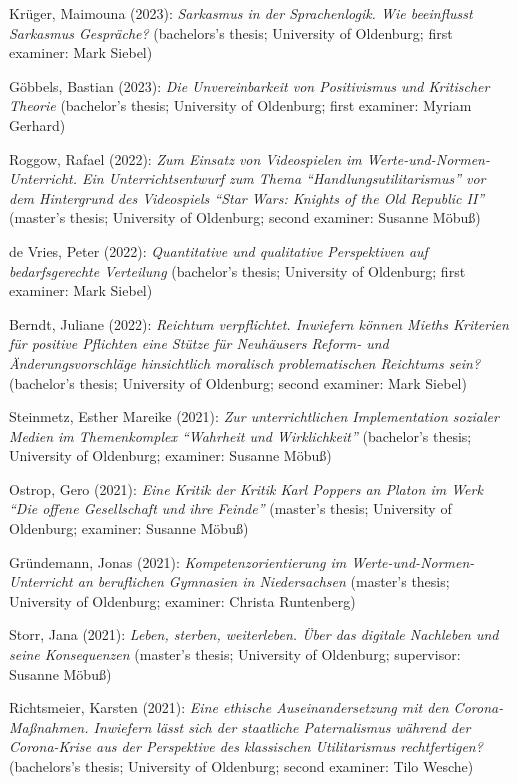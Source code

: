 \documentclass[a4paper,10pt]{article}
\newenvironment{literature}{%
   \parskip6pt\parindent0pt\raggedright
   \def\lititem{\hangindent=1cm\hangafter1}}{%
   \par\ignorespaces}
\begin{document}
\begin{literature}
\lititem Krüger, Maimouna (2023): \textit{Sarkasmus in der Sprachenlogik. Wie beeinflusst Sarkasmus Gespräche?} (bachelors's thesis; University of Oldenburg; first examiner: Mark Siebel)

\lititem Göbbels, Bastian (2023): \textit{Die Unvereinbarkeit von Positivismus und Kritischer Theorie} (bachelor's thesis; University of Oldenburg; first examiner: Myriam Gerhard)

\lititem Roggow, Rafael (2022): \textit{Zum Einsatz von Videospielen im Werte-und-Normen-Unterricht. Ein Unterrichtsentwurf zum Thema \enquote{Handlungsutilitarismus} vor dem Hintergrund des Videospiels \enquote{Star Wars: Knights of the Old Republic II}} (master's thesis; University of Oldenburg; second examiner: Susanne Möbuß)

\lititem de Vries, Peter (2022): \textit{Quantitative und qualitative Perspektiven auf bedarfsgerechte Verteilung} (bachelor's thesis; University of Oldenburg; first examiner: Mark Siebel)

\lititem Berndt, Juliane (2022): \textit{Reichtum verpflichtet. Inwiefern können Mieths Kriterien für positive Pflichten eine Stütze für Neuhäusers Reform- und Änderungsvorschläge hinsichtlich moralisch problematischen Reichtums sein?} (bachelor's thesis; University of Oldenburg; second examiner: Mark Siebel)

\lititem Steinmetz, Esther Mareike (2021): \textit{Zur unterrichtlichen Implementation sozialer Medien im Themenkomplex \enquote{Wahrheit und Wirklichkeit}} (bachelor's thesis; University of Oldenburg; examiner: Susanne Möbuß)

\lititem Ostrop, Gero (2021): \textit{Eine Kritik der Kritik Karl Poppers an Platon im Werk \enquote{Die offene Gesellschaft und ihre Feinde}} (master's thesis; University of Oldenburg; examiner: Susanne Möbuß)

\lititem Gründemann, Jonas (2021): \textit{Kompetenzorientierung im Werte-und-Normen-Unterricht an beruflichen Gymnasien in Niedersachsen} (master's thesis; University of Oldenburg; examiner: Christa Runtenberg)

\lititem Storr, Jana (2021): \textit{Leben, sterben, weiterleben. Über das digitale Nachleben und seine Konsequenzen} (master's thesis; University of Oldenburg; supervisor: Susanne Möbuß)

\lititem Richtsmeier, Karsten (2021): \textit{Eine ethische Auseinandersetzung mit den Corona-Maßnahmen. Inwiefern lässt sich der staatliche Paternalismus während der Corona-Krise aus der Perspektive des klassischen Utilitarismus rechtfertigen?} (bachelors's thesis; University of Oldenburg; second examiner: Tilo Wesche)


\end{literature}
\end{document}
